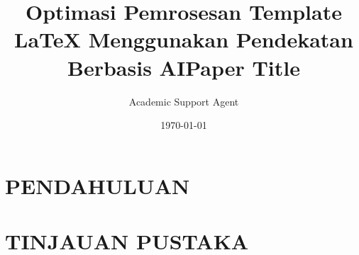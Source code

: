 \documentclass{CVIS}
\title{Optimasi Pemrosesan Template LaTeX Menggunakan Pendekatan Berbasis AI}
\author{Academic Support Agent}
\date{\today}
\begin{document}
\maketitle

\begin{abstract}

\end{abstract}

\chapter{PENDAHULUAN}


\chapter{TINJAUAN PUSTAKA}


\usepackage{amsmath,bm}
\usepackage{graphicx}%
\usepackage{dcolumn}%
\usepackage{subcaption,soul}
\usepackage{caption}
\usepackage[numbers,sort&compress,sectionbib]{natbib}
\usepackage{url}
\usepackage{mleftright}
\usepackage{multirow}
\usepackage{titlesec}
\usepackage[redeflists]{IEEEtrantools}
\usepackage[pagebackref=false,breaklinks=true,colorlinks=true,linkcolor = blue, urlcolor = black,citecolor=black,bookmarks=true]{hyperref}

\newcommand{\etal}{\textit{et al}.}

\title{Paper Title}
\end{document}
